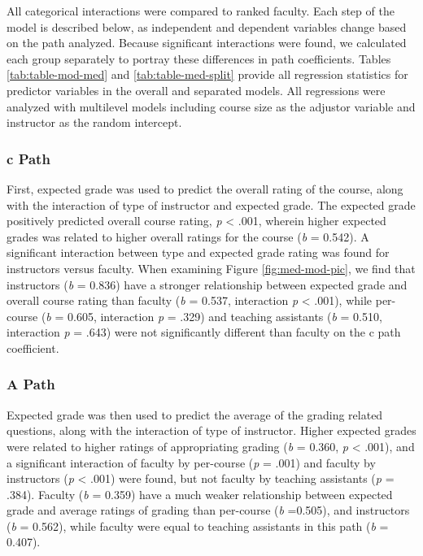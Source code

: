 \documentclass[,man]{apa6}
\theoremstyle{definition}
\theoremstyle{definition}
\theoremstyle{definition}
\theoremstyle{remark}
\begin{document}
All categorical interactions were compared to ranked faculty. Each step
of the model is described below, as independent and dependent variables
change based on the path analyzed. Because significant interactions were
found, we calculated each group separately to portray these differences
in path coefficients. Tables \ref{tab:table-mod-med} and
\ref{tab:table-med-split} provide all regression statistics for
predictor variables in the overall and separated models. All regressions
were analyzed with multilevel models including course size as the
adjustor variable and instructor as the random intercept.

\hypertarget{c-path}{%
\subsubsection{c Path}\label{c-path}}

First, expected grade was used to predict the overall rating of the
course, along with the interaction of type of instructor and expected
grade. The expected grade positively predicted overall course rating,
\emph{p} \textless{} .001, wherein higher expected grades was related to
higher overall ratings for the course (\emph{b} = 0.542). A significant
interaction between type and expected grade rating was found for
instructors versus faculty. When examining Figure \ref{fig:med-mod-pic},
we find that instructors (\emph{b} = 0.836) have a stronger relationship
between expected grade and overall course rating than faculty (\emph{b}
= 0.537, interaction \emph{p} \textless{} .001), while per-course
(\emph{b} = 0.605, interaction \emph{p} = .329) and teaching assistants
(\emph{b} = 0.510, interaction \emph{p} = .643) were not significantly
different than faculty on the c path coefficient.

\hypertarget{a-path}{%
\subsubsection{A Path}\label{a-path}}

Expected grade was then used to predict the average of the grading
related questions, along with the interaction of type of instructor.
Higher expected grades were related to higher ratings of appropriating
grading (\emph{b} = 0.360, \emph{p} \textless{} .001), and a significant
interaction of faculty by per-course (\emph{p} = .001) and faculty by
instructors (\emph{p} \textless{} .001) were found, but not faculty by
teaching assistants (\emph{p} = .384). Faculty (\emph{b} = 0.359) have a
much weaker relationship between expected grade and average ratings of
grading than per-course (\emph{b} =0.505), and instructors (\emph{b} =
0.562), while faculty were equal to teaching assistants in this path
(\emph{b} = 0.407).
\end{document}
